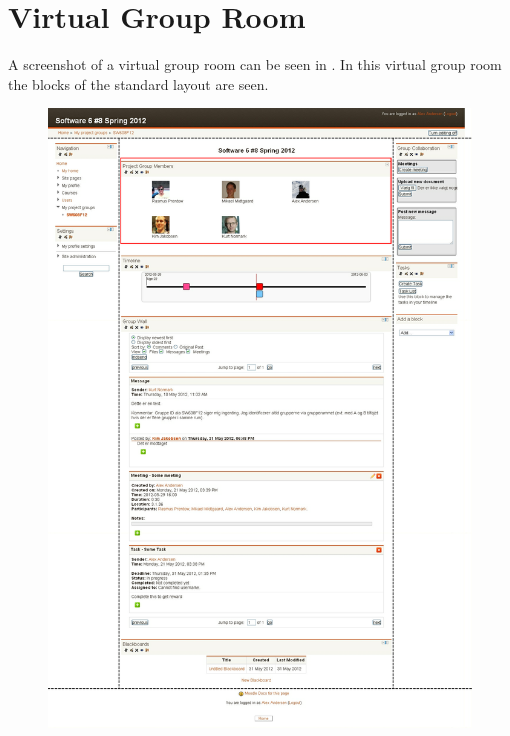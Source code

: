 \section{Virtual Group Room}
\label{sec:prePgrRom}
A screenshot of a virtual group room can be seen in . 
In this virtual group room the blocks of the standard layout are seen.
\begin{figure}[h]
	\centering
		\includegraphics[width=\textwidth]{images/projectgroupnoedit2.png}
	\label{fig:projectgroupnoedit}
\end{figure}

